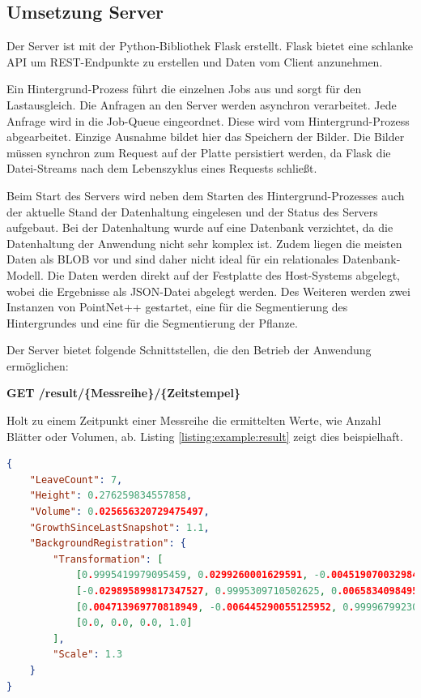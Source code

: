 \documentclass[12pt,titlepage, twoside]{article}
\begin{document}
\subsection{Umsetzung Server}
\label{sec:realisierung:implementierung4}

Der Server ist mit der Python-Bibliothek Flask erstellt. Flask bietet eine schlanke API um REST-Endpunkte zu erstellen und Daten vom Client anzunehmen. 

Ein Hintergrund-Prozess führt die einzelnen Jobs aus und sorgt für den Lastausgleich. Die Anfragen an den Server werden asynchron verarbeitet. 
Jede Anfrage wird in die Job-Queue eingeordnet. Diese wird vom Hintergrund-Prozess abgearbeitet.
Einzige Ausnahme bildet hier das Speichern der Bilder. Die Bilder müssen synchron zum Request auf der Platte persistiert werden, da Flask die Datei-Streams nach dem Lebenszyklus eines Requests schließt.

Beim Start des Servers wird neben dem Starten des Hintergrund-Prozesses auch der aktuelle Stand der Datenhaltung eingelesen und der Status des Servers aufgebaut. 
Bei der Datenhaltung wurde auf eine Datenbank verzichtet, da die Datenhaltung der Anwendung nicht sehr komplex ist. 
Zudem liegen die meisten Daten als BLOB \cite{sears2007blob} vor und sind daher nicht ideal für ein relationales Datenbank-Modell. 
Die Daten werden direkt auf der Festplatte des Host-Systems abgelegt, wobei die Ergebnisse als JSON-Datei abgelegt werden.
Des Weiteren werden zwei Instanzen von PointNet++ gestartet, eine für die Segmentierung des Hintergrundes und eine für die Segmentierung der Pflanze.

Der Server bietet folgende Schnittstellen, die den Betrieb der Anwendung ermöglichen:

\textbf{GET /result/\{Messreihe\}/\{Zeitstempel\}}

Holt zu einem Zeitpunkt einer Messreihe die ermittelten Werte, wie Anzahl Blätter oder Volumen, ab. Listing \ref{listing:example:result} zeigt dies beispielhaft.

\begin{lstlisting}[language=json, caption={Beispiel Ergebnisse eines Zeitstempels}, captionpos=b, label=listing:example:result]
{
    "LeaveCount": 7,
    "Height": 0.276259834557858,
    "Volume": 0.025656320729475497,
    "GrowthSinceLastSnapshot": 1.1,
    "BackgroundRegistration": {
        "Transformation": [
            [0.9995419979095459, 0.0299260001629591, -0.004519070032984018, -0.030479200184345245], 
            [-0.029895899817347527, 0.9995309710502625, 0.0065834098495543, 0.025272000581026077], 
            [0.004713969770818949, -0.006445290055125952, 0.9999679923057556, 0.0013244400033727288], 
            [0.0, 0.0, 0.0, 1.0]
        ],
        "Scale": 1.3
    }
}
\end{lstlisting}
\end{document}
